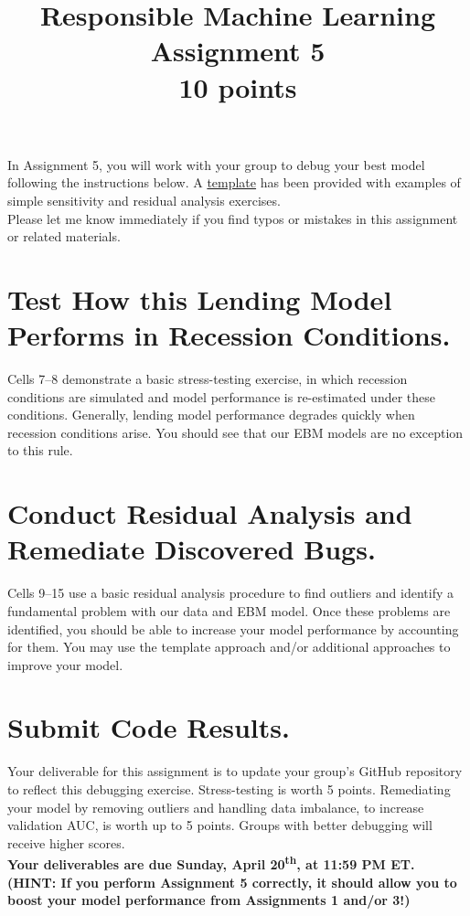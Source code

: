 \documentclass[fleqn]{article}
\title{Responsible Machine Learning\\\Large{Assignment 5}\\\Large{10 points}}
\begin{document}
\maketitle

\noindent In Assignment 5, you will work with your group to debug your best model following the instructions below. A \href{https://nbviewer.jupyter.org/github/jphall663/GWU_rml/blob/master/assignments/assignment_5/assign_5_template.ipynb?flush_cache=true}{template} has been provided with examples of simple sensitivity and residual analysis exercises.\\
\noindent Please let me know immediately if you find typos or mistakes in this assignment or related materials. 

\section{Test How this Lending Model Performs in Recession Conditions.}

Cells 7--8 demonstrate a basic stress-testing exercise, in which recession conditions are simulated and model performance is re-estimated under these conditions. Generally, lending model performance degrades quickly when recession conditions arise. You should see that our EBM models are no exception to this rule.\\

\section{Conduct Residual Analysis and Remediate Discovered Bugs.}

Cells 9--15 use a basic residual analysis procedure to find outliers and identify a fundamental problem with our data and EBM model. Once these problems are identified, you should be able to increase your model performance by accounting for them. You may use the template approach and/or additional approaches to improve your model. \\

\section{Submit Code Results.}

Your deliverable for this assignment is to update your group's GitHub repository to reflect this debugging exercise. Stress-testing is worth 5 points. Remediating your model by removing outliers and handling data imbalance, to increase validation AUC, is worth up to 5 points. Groups with better debugging will receive higher scores. \\

\noindent \textbf{Your deliverables are due Sunday, April 20\textsuperscript{th}, at 11:59 PM ET.}\\

\noindent \textbf{(HINT: If you perform Assignment 5 correctly, it should allow you to boost your model performance from Assignments 1  and/or 3!)}
\end{document}
